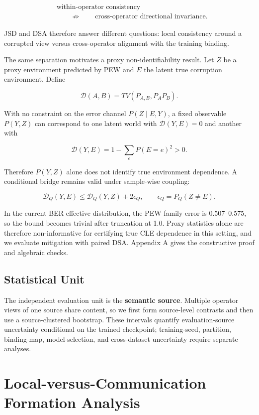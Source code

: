 \[
\begin{aligned}
&\text{within-operator consistency}\\
&\qquad\not\Rightarrow\qquad
\text{cross-operator directional invariance}.
\end{aligned}
\]

JSD and DSA therefore answer different questions: local consistency around a corrupted view versus cross-operator alignment with the training binding.

The same separation motivates a proxy non-identifiability result. Let \(Z\) be a proxy environment predicted by PEW and \(E\) the latent true corruption environment. Define

\[
\mathcal D(A,B)=TV(P_{A,B},P_AP_B).
\]

With no constraint on the error channel \(P(Z\mid E,Y)\), a fixed observable \(P(Y,Z)\) can correspond to one latent world with \(\mathcal D(Y,E)=0\) and another with

\[
\mathcal D(Y,E)=1-\sum_eP(E=e)^2>0.
\]

Therefore \(P(Y,Z)\) alone does not identify true environment dependence. A conditional bridge remains valid under sample-wise coupling:

\[
\mathcal D_Q(Y,E)\le
\mathcal D_Q(Y,Z)+2\epsilon_Q,
\qquad
\epsilon_Q=P_Q(Z\neq E).
\]

In the current BER effective distribution, the PEW family error is \(0.507\)--\(0.575\), so the bound becomes trivial after truncation at 1.0. Proxy statistics alone are therefore non-informative for certifying true CLE dependence in this setting, and we evaluate mitigation with paired DSA. Appendix A gives the constructive proof and algebraic checks.

\subsection{Statistical Unit}

The independent evaluation unit is the \textbf{semantic source}. Multiple operator views of one source share content, so we first form source-level contrasts and then use a source-clustered bootstrap. These intervals quantify evaluation-source uncertainty conditional on the trained checkpoint; training-seed, partition, binding-map, model-selection, and cross-dataset uncertainty require separate analyses.

\section{Local-versus-Communication Formation Analysis}

